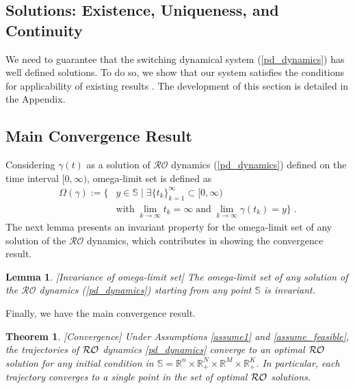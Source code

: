 \documentclass[journal,twoside,web]{ieeecolor}
\newtheorem{theorem}{Theorem}
\newtheorem{lemma}{Lemma}
\begin{document}
\subsection*{Solutions: Existence, Uniqueness, and Continuity}
We need to guarantee that the switching dynamical system (\ref{pd_dynamics}) has well defined solutions.
To do so, we show that our system satisfies the conditions for applicability of existing results \cite{cherukuri2016}. The development of this section is detailed in the Appendix.

\subsection*{Main Convergence Result}
Considering $\gamma(t)$ as a solution of $\mathcal{RO}$ dynamics (\ref{pd_dynamics}) defined on the time interval $[0,\infty)$, omega-limit set is defined as
\begin{align} \label{omega_limit}
\Omega(\gamma):=\{& y \in \mathbb S \;|\; \exists \{t_k\}_{k=1}^\infty \subset [0,\infty) \nonumber\\
&\text{with}\; \lim_{k \rightarrow \infty} t_k=\infty \;\text{and}\; \lim_{k \rightarrow \infty} \gamma(t_k)=y\}\;.
\end{align}
The next lemma presents an invariant property for the omega-limit set of any solution of the $\mathcal{RO}$ dynamics, which contributes in showing the convergence result.
\begin{lemma}\cite[Lemma~4.4]{cherukuri2016}[Invariance of omega-limit set]
The omega-limit set of any solution of the $\mathcal{RO}$ dynamics (\ref{pd_dynamics}) starting from any point $\mathbb S$ is invariant.
\label{omega_invariance}
\end{lemma}

Finally, we have the main convergence result.
\begin{theorem}\label{maintheorem}[Convergence]
Under Assumptions \ref{assume1} and \ref{assume_feasible}, the trajectories of ${\cal RO}$ dynamics \eqref{pd_dynamics} converge to an optimal ${\cal RO}$ solution for any initial condition in $\mathbb{S}=\mathbb{R}^n\times \mathbb{R}^N_{+}\times \mathbb{R}^M\times \mathbb{R}^K_+$. In particular, each trajectory converges to a single point in the set of optimal ${\cal RO}$ solutions.
\end{theorem}
\end{document}
